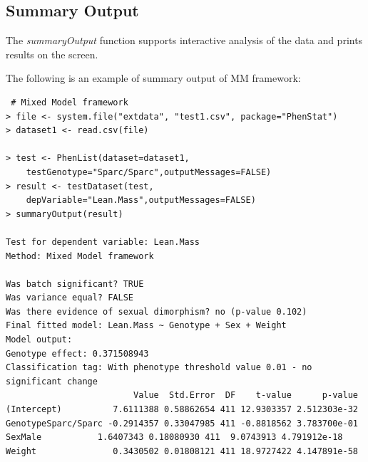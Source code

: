 \documentclass[12pt,a4paper]{article}
\begin{document}
\subsection{Summary Output}
\label{SummaryOutput}
The \textit{summaryOutput} function supports interactive analysis of the data and prints results on the screen.

The following is an example of summary output of MM framework:


\begingroup
    \fontsize{8pt}{12pt}\selectfont
\begin{verbatim}
 # Mixed Model framework
> file <- system.file("extdata", "test1.csv", package="PhenStat") 
> dataset1 <- read.csv(file)

> test <- PhenList(dataset=dataset1,
    testGenotype="Sparc/Sparc",outputMessages=FALSE)
> result <- testDataset(test,
    depVariable="Lean.Mass",outputMessages=FALSE)
> summaryOutput(result)

Test for dependent variable: Lean.Mass
Method: Mixed Model framework

Was batch significant? TRUE
Was variance equal? FALSE
Was there evidence of sexual dimorphism? no (p-value 0.102)
Final fitted model: Lean.Mass ~ Genotype + Sex + Weight
Model output:
Genotype effect: 0.371508943
Classification tag: With phenotype threshold value 0.01 - no significant change
                         Value  Std.Error  DF    t-value      p-value
(Intercept)          7.6111388 0.58862654 411 12.9303357 2.512303e-32
GenotypeSparc/Sparc -0.2914357 0.33047985 411 -0.8818562 3.783700e-01
SexMale           1.6407343 0.18080930 411  9.0743913 4.791912e-18
Weight               0.3430502 0.01808121 411 18.9727422 4.147891e-58
\end{verbatim}
\endgroup
\end{document}
